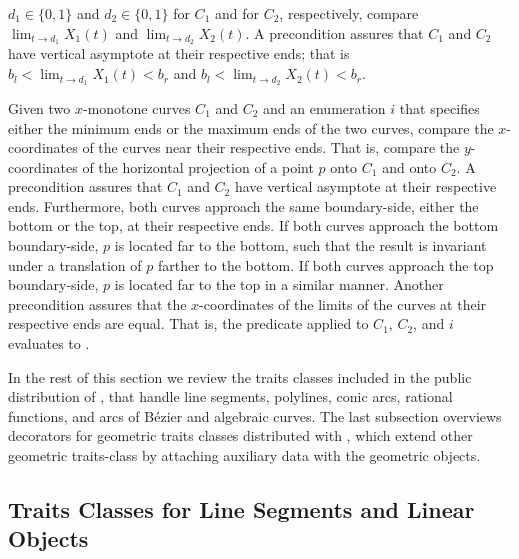 \begin{description}
    $d_1\in \{0,1\}$ and $d_2 \in \{0,1\}$ for $C_1$ and for $C_2$,
    respectively, compare $\lim_{t \rightarrow d_1} X_1(t)$ and
    $\lim_{t \rightarrow d_2} X_2(t)$. A precondition assures that $C_1$
    and $C_2$ have vertical asymptote at their respective ends;
    that is $b_l < \lim_{t \rightarrow d_1} X_1(t) < b_r$ and
    $b_l < \lim_{t \rightarrow d_2} X_2(t)< b_r$.
%
\item[\ccc{Compare_x_near_limit_2}:]
  Given two $x$-monotone curves $C_1$ and $C_2$ and an enumeration $i$
  that specifies either the minimum ends or the maximum ends of the
  two curves, compare the $x$-coordinates of the curves near their
  respective ends. That is, compare the $y$-coordinates of the
  horizontal projection of a point $p$ onto $C_1$ and onto $C_2$.
  A precondition assures that $C_1$ and $C_2$ have vertical asymptote
  at their respective ends. Furthermore, both curves approach the same
  boundary-side, either the bottom or the top, at their respective
  ends. If both curves approach the bottom boundary-side, $p$ is
  located far to the bottom, such that the result is invariant under a
  translation of $p$ farther to the bottom. If both curves approach
  the top boundary-side, $p$ is located far to the top in a similar
  manner. Another precondition assures that the $x$-coordinates of the
  limits of the curves at their respective ends are equal. That is,
  the predicate  applied to $C_1$, $C_2$,
  and $i$ evaluates to .
\end{description}
\lcTex{\color{black}}

In the rest of this section we review the traits classes
included in the public distribution of \cgal, that handle line
segments, polylines, conic arcs, rational functions, and arcs of
B\'{e}zier and algebraic curves. 
The last subsection overviews
decorators for geometric traits classes distributed with \cgal,
which extend other geometric traits-class by attaching auxiliary
data with the geometric objects.

\subsection{Traits Classes for Line Segments and Linear Objects
\label{arr_ssec:tr_segs}}

